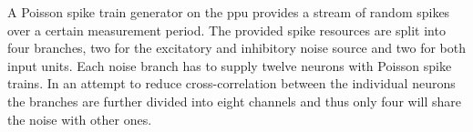 A Poisson spike train generator on the \gls{ppu} provides a stream of random spikes over a certain measurement period. The provided spike resources are split into four branches, two for the excitatory and inhibitory noise source and two for both input units. Each noise branch has to supply twelve neurons with Poisson spike trains. In an attempt to reduce cross-correlation between the individual neurons the branches are further divided into eight channels and thus only four will share the noise with other ones.


